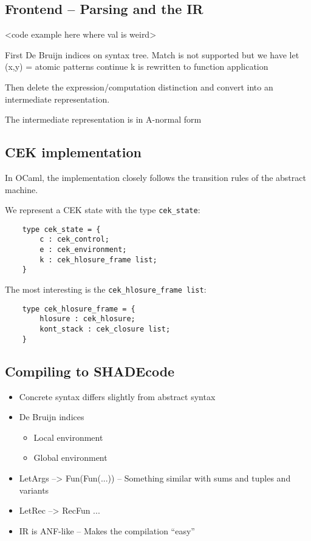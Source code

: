 \documentclass[class=article, crop=false]{standalone}
\begin{document}
\subsection{Frontend -- Parsing and the IR}

<code example here where val is weird>

First De Bruijn indices on syntax tree.
Match is not supported but we have let (x,y) =
atomic patterns
continue k is rewritten to function application

Then delete the expression/computation distinction and convert into
an intermediate representation.

The intermediate representation is in A-normal form 

\subsection{CEK implementation}

In OCaml, the implementation closely follows the transition rules of the abstract machine.

We represent a CEK state with the type \verb|cek_state|:
\begin{verbatim}
    type cek_state = {
        c : cek_control;
        e : cek_environment;
        k : cek_hlosure_frame list;
    }
\end{verbatim}

The most interesting is the \verb|cek_hlosure_frame list|:
\begin{verbatim}
    type cek_hlosure_frame = {
        hlosure : cek_hlosure;
        kont_stack : cek_closure list;
    }
\end{verbatim}

\subsection{Compiling to SHADEcode}


\begin{itemize}
\item Concrete syntax differs slightly from abstract syntax
\item De Bruijn indices
\begin{itemize}
    \item Local environment
    \item Global environment
\end{itemize}
\item LetArgs --> Fun(Fun(...)) -- Something similar with sums and tuples and variants
\item LetRec --> RecFun ...
\item IR is ANF-like -- Makes the compilation ``easy''
\end{itemize}
\end{document}
